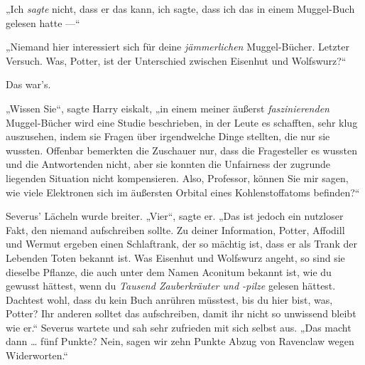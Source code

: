 „Ich \emph{sagte} nicht, dass er das kann, ich sagte, dass ich das in einem Muggel-Buch gelesen hatte —“

„Niemand hier interessiert sich für deine \emph{jämmerlichen} Muggel-Bücher. Letzter Versuch. Was, Potter, ist der Unterschied zwischen Eisenhut und Wolfswurz?“

Das war’s.

„Wissen Sie“, sagte Harry eiskalt, „in einem meiner äußerst \emph{faszinierenden} Muggel-Bücher wird eine Studie beschrieben, in der Leute es schafften, sehr klug auszusehen, indem sie Fragen über irgendwelche Dinge stellten, die nur sie wussten. Offenbar bemerkten die Zuschauer nur, dass die Fragesteller es wussten und die Antwortenden nicht, aber sie konnten die Unfairness der zugrunde liegenden Situation nicht kompensieren. Also, Professor, können Sie mir sagen, wie viele Elektronen sich im äußersten Orbital eines Kohlenstoffatoms befinden?“

Severus’ Lächeln wurde breiter.
„Vier“, sagte er.
„Das ist jedoch ein nutzloser Fakt, den niemand aufschreiben sollte. Zu deiner Information, Potter, Affodill und Wermut ergeben einen Schlaftrank, der so mächtig ist, dass er als Trank der Lebenden Toten bekannt ist. Was Eisenhut und Wolfswurz angeht, so sind sie dieselbe Pflanze, die auch unter dem Namen Aconitum bekannt ist, wie du gewusst hättest, wenn du \emph{Tausend Zauberkräuter und -pilze} gelesen hättest. Dachtest wohl, dass du kein Buch anrühren müsstest, bis du hier bist, was, Potter? Ihr anderen solltet das aufschreiben, damit ihr nicht so unwissend bleibt wie er.“ Severus wartete und sah sehr zufrieden mit sich selbst aus.
„Das macht dann … fünf Punkte? Nein, sagen wir zehn Punkte Abzug von Ravenclaw wegen Widerworten.“

